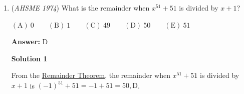 \begin{enumerate}
 \textbf{Answer: }A



\textbf{Solution 1}

Let's write out the multiplication, so that it becomes easier to see.

 
 \[(1+2x-x^2)(1+2x-x^2)(1+2x-x^2)(1+2x-x^2)\]

 We can now see that the only way to get an $x^7$ is by taking three $-x^2$ and one $2x$. There are $\binom{4}{1}=4$ ways to pick which term the $2x$ comes from, and the coefficient of each one is $(-1)^3(2)=-2$. Therefore, the coefficient of $x^7$ is $(4)(-2)=-8, \boxed{\text{A}}$.

 



\textbf{Solution 2}


 \[(x^2-2x-1)^4=(x^2-2x+1-2)^4=((x-1)^2-(\sqrt{2})^2)^4=(x-1-\sqrt{2})^4(x-1+\sqrt{2})^4\]Each of the two polynomials can have terms of order 4,3,2,1,0. The only way to obtain a term of order 7 is either a term of order 4 from the first and 3 from the second, or the other way around. Notice that the terms of order 4 must necessarily have coefficient 1. Also keeping in mind that the coefficient of $x^3$ in $(x+a)^4$ is 4a, we have:

 - Coefficient of $x^3$ (by extension $x^7$) in the first polynomial $=4\times (-1-\sqrt{2})$;

 - Coefficient of $x^3$ (by extension $x^7$) in the second polynomial is $4\times (-1+\sqrt{2})$.

 So the coefficient of $x^7$ in the expansion is $(-4-4\sqrt{2})+(-4+4\sqrt{2})=-4-4=-8, \boxed{\text{A}}$.

 


	\item (\textit{AHSME 1974}) What is the remainder when $x^{51}+51$ is divided by $x+1$?


 $\mathrm{(A)\ } 0 \qquad \mathrm{(B) \ }1 \qquad \mathrm{(C) \  } 49 \qquad \mathrm{(D) \  } 50 \qquad \mathrm{(E) \  }51$

 \textbf{Answer: }D



\textbf{Solution 1}

From the \href{https://artofproblemsolving.com/wiki/index.php?title=Remainder\_Theorem}{Remainder Theorem}, the remainder when $x^{51}+51$ is divided by $x+1$ is $(-1)^{51}+51=-1+51=50, \boxed{\text{D}}$.

 




\end{enumerate}

